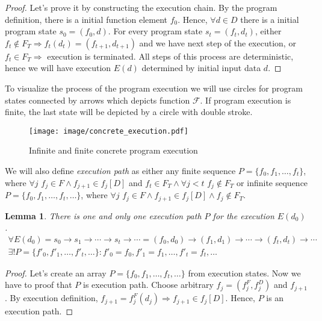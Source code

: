 \documentclass[fleqn,oneside,a4]{article}
\newcommand{\Ra}{\Rightarrow}
\newcommand{\ra}{\rightarrow}
\newcommand{\term}[1]{\textit{#1}\index{#1}}
\newtheorem{lemma}[theorem]{Lemma}
\begin{document}
\begin{proof}
    Let's prove it by constructing the execution chain.
    By the program definition, there is a initial function element $f_0$.
    Hence, $\forall d \in D$
    there is a initial program state $s_0 = (f_0, d)$.
    For every program state $s_t = (f_t, d_t)$,
    either $f_t \notin F_T \Ra f_t(d_t) = (f_{t + 1}, d_{t + 1})$
        and we have next step of the execution,
    or $f_t \in F_T \Ra$ execution is terminated.
    All steps of this process are deterministic,
    hence we will have execution $E(d)$ determined by initial input data $d$.
\end{proof}

To visualize the process of the program execution we will use circles
for program states connected by arrows which depicts function $\mathcal{F}$.
If program execution is finite, the last state will be depicted by
a circle with double stroke.

\begin{figure}[h!]
    \begin{center}
        \texttt{[image: image/concrete\_execution.pdf]}
    \end{center}
    \caption{Infinite and finite concrete program execution}
\end{figure}

We will also define \term{execution path} as either any finite sequence
$P = \{f_0, f_1, \dots, f_t\}$, where
$\forall j \,\, f_j \in F \land f_{j + 1} \in f_j[D]$
and $f_t \in F_T \land \forall j < t \,\, f_j \notin F_T$
or infinite sequence $P = \{f_0, f_1, \dots, f_t, \dots\}$, where
$\forall j \,\, f_j \in F \land f_{j + 1} \in f_j[D] \land f_j \notin F_T$.

\begin{lemma}
    There is one and only one execution path $P$ for the execution $E(d_0)$.
    \[ \begin{array}{c}
    \forall E(d_0) = s_0 \ra s_1 \ra \cdots \ra s_t \ra \cdots =
        (f_0, d_0) \ra (f_1, d_1) \ra \cdots \ra (f_t, d_t) \ra \cdots \\
    \exists! P = \{f'_0, f'_1, \dots, f'_t, \dots\}:
        f'_0 = f_0, f'_1 = f_1, \dots, f'_t = f_t, \dots
    \end{array} \]
\end{lemma}

\begin{proof}
    Let's create an array $P = \{f_0, f_1, \dots, f_t, \dots\}$ from
    execution states.
    Now we have to proof that $P$ is execution path.
    Choose arbitrary $f_j = (f_j^F, f_j^D)$ and $f_{j + 1}$.
    By execution definition,
    $f_{j + 1} = f_j^F(d_j) \Ra f_{j + 1} \in f_j[D]$.
    Hence, $P$ is an execution path.
\end{proof}
\end{document}
